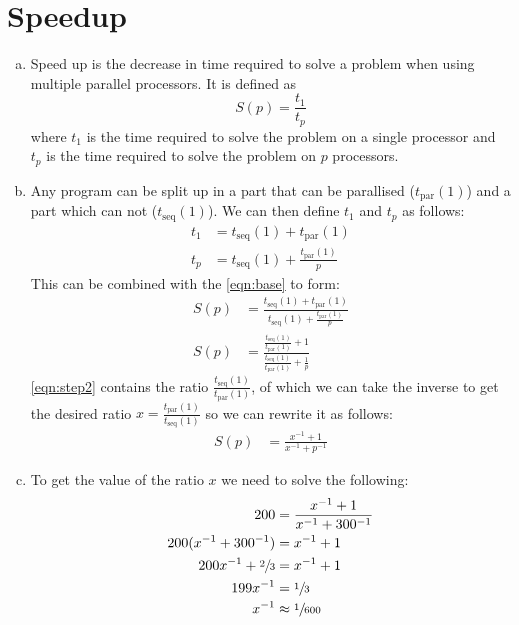 \documentclass[a4paper]{article}
\begin{document}
\section{Speedup}
\begin{enumerate}[(a)]
	\item Speed up is the decrease in time required to solve a problem when using multiple parallel processors. It is defined as
		\begin{equation}
			S(p) = \frac{t_1}{t_p} \label{eqn:base}
		\end{equation}
		where $t_1$ is the time required to solve the problem on a single processor and $t_p$ is the time required to solve the problem on $p$ processors.
	\item Any program can be split up in a part that can be parallised ($t_\text{par}(1)$) and a part which can not ($t_\text{seq}(1)$). We can then define $t_1$ and $t_p$ as follows:
		\begin{align*}
			t_1 &= t_\text{seq}(1) + t_\text{par}(1) \\
			t_p &= t_\text{seq}(1) + \frac{t_\text{par}(1)}{p}
		\end{align*}
		This can be combined with the \autoref{eqn:base} to form:
		\begin{align}
			S(p) &= \frac{t_\text{seq}(1) + t_\text{par}(1)}{t_\text{seq}(1) + \frac{t_\text{par}(1)}{p}} \nonumber \\
			S(p) &= \frac{\frac{t_\text{seq}(1)}{t_\text{par}(1)} + 1}{\frac{t_\text{seq}(1)}{t_\text{par}(1)} + \frac{1}{p}} \label{eqn:step2}
		\end{align}
		\autoref{eqn:step2} contains the ratio $\displaystyle \frac{t_\text{seq}(1)}{t_\text{par}(1)}$, of which we can take the inverse to get the desired ratio $\displaystyle x = \frac{t_\text{par}(1)}{t_\text{seq}(1)}$ so we can rewrite it as follows:
		\begin{align*}
			S(p) &= \frac{x^{-1} + 1}{x^{-1} + p^{-1}}
		\end{align*}
	\item To get the value of the ratio $x$ we need to solve the following:
		\begin{align*}
			200 &= \frac{x^{-1} + 1}{x^{-1} + 300^{-1}} \\
			200 (x^{-1} + 300^{-1}) &= x^{-1} + 1 \\
			200 x^{-1} + \sfrac{2}{3} &= x^{-1} + 1 \\
			199 x^{-1} &= \sfrac{1}{3} \\
			x^{-1} &\approx \sfrac{1}{600} \\

\end{align*}
\end{enumerate}
\end{document}
